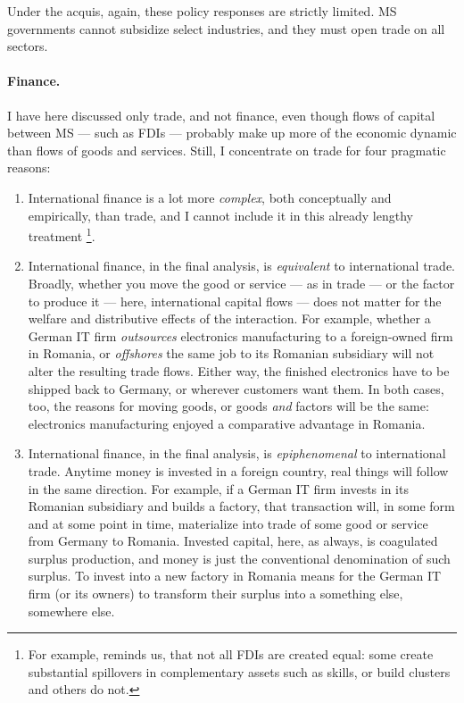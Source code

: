 \documentclass[11pt,a4paper,oneside]{article}
\begin{document}
Under the acquis, again, these policy responses are strictly limited.
\gls{MS} governments cannot subsidize select industries, and they must open trade on all sectors.

\paragraph{Finance.}
I have here discussed only trade, and not finance, even though flows of capital between \gls{MS} --- such as \glspl{FDI} --- probably make up more of the economic dynamic than flows of goods and services.
Still, I concentrate on trade for four pragmatic reasons:
\begin{enumerate}
	\item International finance is a lot more \emph{complex}, both conceptually and empirically, than trade, and I cannot include it in this already lengthy treatment
		\footnote{
			For example, \cite{Narula2005} reminds us, that not all \glspl{FDI} are created equal:
			some create substantial spillovers in complementary assets such as skills, or build clusters and others do not.
		}.
	\item International finance, in the final analysis, is \emph{equivalent} to international trade.
	Broadly, whether you move the good or service --- as in trade --- or the factor to produce it --- here, international capital flows --- does not matter for the welfare and distributive effects of the interaction.
	For example, whether a German IT firm \emph{outsources} electronics manufacturing to a foreign-owned firm in Romania, or \emph{offshores} the same job to its Romanian subsidiary will not alter the resulting trade flows.
	Either way, the finished electronics have to be shipped back to Germany, or wherever customers want them.
	In both cases, too, the reasons for moving goods, or goods \emph{and} factors will be the same:
	electronics manufacturing enjoyed a comparative advantage in Romania.
	\item International finance, in the final analysis, is \emph{epiphenomenal} to international trade.
	Anytime money is invested in a foreign country, real things will follow in the same direction.
	For example, if a German IT firm invests in its Romanian subsidiary and builds a factory, that transaction will, in some form and at some point in time, materialize into trade of some good or service from Germany to Romania.
	Invested capital, here, as always, is coagulated surplus production, and money is just the conventional denomination of such surplus.
	To invest into a new factory in Romania means for the German IT firm (or its owners) to transform their surplus into a something else, somewhere else.

\end{enumerate}
\end{document}
